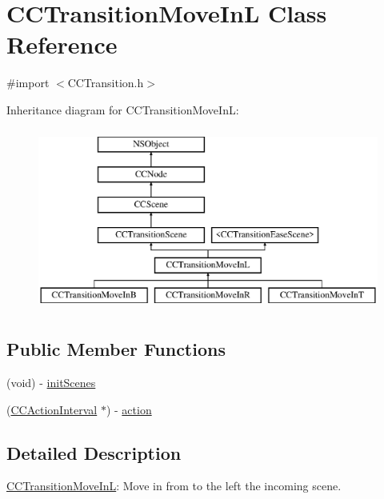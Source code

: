 \hypertarget{interface_c_c_transition_move_in_l}{\section{C\-C\-Transition\-Move\-In\-L Class Reference}
\label{interface_c_c_transition_move_in_l}
}


{\ttfamily \#import $<$C\-C\-Transition.\-h$>$}

Inheritance diagram for C\-C\-Transition\-Move\-In\-L\-:\begin{figure}[H]
\begin{center}
\leavevmode
\includegraphics[height=6.000000cm]{interface_c_c_transition_move_in_l}
\end{center}
\end{figure}
\subsection*{Public Member Functions}
\begin{DoxyCompactItemize}
\item 
(void) -\/ \hyperlink{interface_c_c_transition_move_in_l_a0cb17195dedf0a4778ede1324068fdaf}{init\-Scenes}
\item 
(\hyperlink{class_c_c_action_interval}{C\-C\-Action\-Interval} $\ast$) -\/ \hyperlink{interface_c_c_transition_move_in_l_a17d6e390b9368cf823041bb632f71eb4}{action}
\end{DoxyCompactItemize}


\subsection{Detailed Description}
\hyperlink{interface_c_c_transition_move_in_l}{C\-C\-Transition\-Move\-In\-L}\-: Move in from to the left the incoming scene. 

